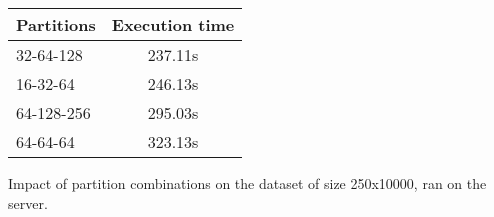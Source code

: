\begin{tabular}{l c}
    \toprule
    \textbf{Partitions} & \textbf{Execution time} \\
    \midrule
    32-64-128     & 237.11s    \\ 
    16-32-64      & 246.13s    \\ 
    64-128-256    & 295.03s    \\
    64-64-64      & 323.13s    \\
    \bottomrule
\end{tabular}
\makeatletter{}\makeatother%
\caption{Impact of partition combinations on the dataset of size 250x10000, ran on the server.}
\label{tab:q2_partitions}